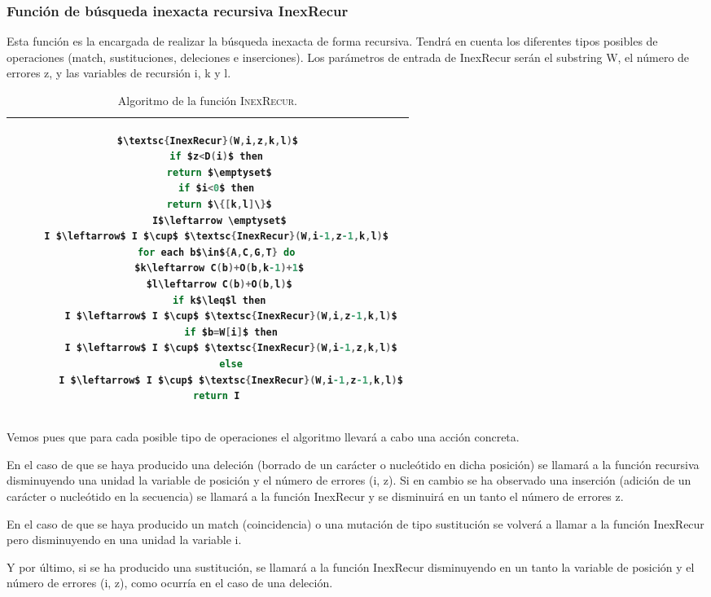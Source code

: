 \documentclass{article}
\newcommand{\tempcaption}{}
\newenvironment{codesnip}[1]{
\begin{table}[h!]
\gdef\tempcaption{#1}
\centering
\begin{tabular}{|c|}
\hline}
{\\\hline
\end{tabular}
\caption{\tempcaption}
\end{table}}
\begin{document}
\vspace{-0.5cm}
\subsubsection{Función de búsqueda inexacta recursiva InexRecur}

Esta función es la encargada de realizar la búsqueda inexacta de forma
recursiva.   Tendrá  en  cuenta  los  diferentes  tipos  posibles   de
operaciones (match, sustituciones,  deleciones	e  inserciones).   Los
parámetros de entrada de InexRecur serán el substring W, el número  de
errores   z,   y   las	 variables   de   recursión   i,   k   y    l.

\begin{codesnip}{Algoritmo de la función \textsc{InexRecur}.\cite{li_durbin_2009}}
\begin{lstlisting}[mathescape=true, language = C]
$\textsc{InexRecur}(W,i,z,k,l)$
   if $z<D(i)$ then
   	return $\emptyset$
   if $i<0$ then
   	return $\{[k,l]\}$
	I$\leftarrow \emptyset$
   I $\leftarrow$ I $\cup$ $\textsc{InexRecur}(W,i-1,z-1,k,l)$
   for each b$\in${A,C,G,T} do
   	$k\leftarrow C(b)+O(b,k-1)+1$
   	$l\leftarrow C(b)+O(b,l)$
   	if k$\leq$l then
   	    I $\leftarrow$ I $\cup$ $\textsc{InexRecur}(W,i,z-1,k,l)$
   	    if $b=W[i]$ then
   		I $\leftarrow$ I $\cup$ $\textsc{InexRecur}(W,i-1,z,k,l)$
   	    else
   		I $\leftarrow$ I $\cup$ $\textsc{InexRecur}(W,i-1,z-1,k,l)$
   return I
\end{lstlisting}
\end{codesnip}

Vemos pues que para cada posible tipo de operaciones el algoritmo
llevará a cabo una acción concreta.

En el caso de que se  haya  producido  una  deleción  (borrado	de  un
carácter o nucleótido en dicha	posición)  se  llamará	a  la  función
recursiva disminuyendo una unidad la variable de posición y el	número
de errores (i, z).   Si  en  cambio  se  ha  observado	una  inserción
(adición de un carácter o nucleótido en la secuencia) se llamará a  la
función InexRecur y se disminuirá en un tanto el número de errores  z.

En el caso de que se haya producido  un  match	(coincidencia)	o  una
mutación de  tipo  sustitución	se  volverá  a	llamar	a  la  función
InexRecur pero disminuyendo en una unidad la  variable  i.

Y por último, si se ha producido una  sustitución,  se	llamará  a  la
función InexRecur disminuyendo en un tanto la variable de  posición  y
el número de errores (i, z), como ocurría en el caso de una  deleción.
\end{document}
